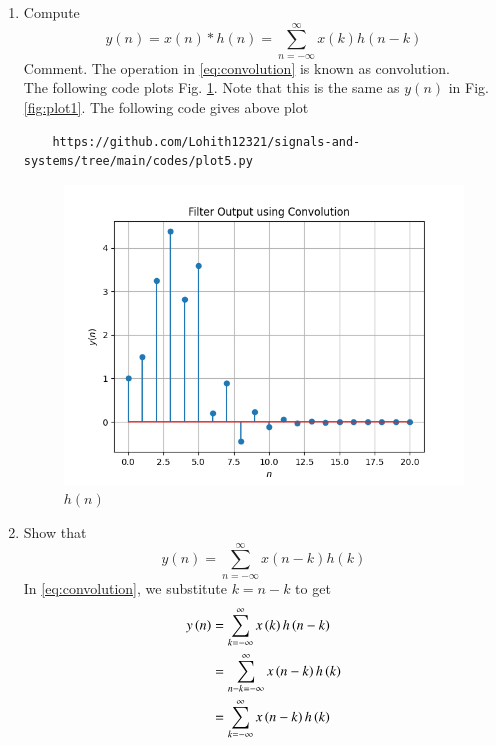 \documentclass[journal,12pt,twocolumn]{IEEEtran}
\theoremstyle{remark}
\begin{document}
\begin{enumerate}[label=\thesection.\arabic*
,ref=\thesection.\theenumi]
\begin{enumerate}[label=\thesection.\arabic*
,ref=\thesection.\theenumi]
\begin{enumerate}[label=\thesection.\arabic*
,ref=\thesection.\theenumi]
\item Compute 
%
\begin{equation}
\label{eq:convolution}
y(n) = x(n)*h(n) = \sum_{n=-\infty}^{\infty}x(k)h(n-k)
\end{equation}
%
Comment. The operation in \eqref{eq:convolution} is known as
convolution.
%
\\
\solution The following code plots Fig. \ref{fig:plot5}. Note that this is the same as 
$y(n)$ in  Fig. \ref{fig:plot1}. 
The following code gives above plot
\begin{lstlisting}
    https://github.com/Lohith12321/signals-and-systems/tree/main/codes/plot5.py
\end{lstlisting}
\begin{figure}[ht]
    \centering  
\includegraphics[width=\columnwidth]{figs/plot5.png}
\begin{center}
    \caption{$h(n)$}
\end{center}
    \label{fig:}
    \label{fig:plot5}
\end{figure}
\item Show that
\begin{equation}
y(n) =  \sum_{n=-\infty}^{\infty}x(n-k)h(k)
\end{equation}
\solution
In \eqref{eq:convolution}, we substitute $k = n - k$ to get
\begin{align}
y\left(n\right) &= \sum_{k=-\infty}^{\infty}x\left(k\right)h\left(n - k\right) \\
		  &= \sum_{n - k=-\infty}^{\infty}x\left(n - k\right)h\left(k\right) \\
		  &= \sum_{k=-\infty}^{\infty}x\left(n - k\right)h\left(k\right)
\end{align}
\end{enumerate}
\begin{enumerate}[label=\thesection.\arabic*
,ref=\thesection.\theenumi]

\end{enumerate}
\end{enumerate}
\end{enumerate}
\end{document}
